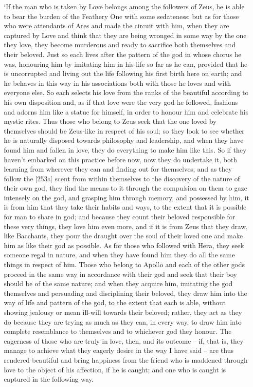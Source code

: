 ‘If the man who is taken by Love belongs among the followers of Zeus, he
is able to bear the burden of the Feathery One with some sedateness; but
as for those who were attendants of
Ares  and made
the circuit with him, when they are captured by Love and think that they
are being wronged in some way by the one they love, they become
murderous and ready to sacrifice both themselves and their beloved. Just
so each lives after the pattern  of the god in whose chorus he
was, honouring him by imitating him in his life so far as he can,
provided that he is uncorrupted and living out the life following his
first birth here on earth; and he behaves in this way in his
associations both with those he loves and with everyone else. So each
selects his love from  the ranks of the beautiful according to
his own disposition and, as if that love were the very god he followed,
fashions and adorns him like a statue for himself, in order to honour
him  and celebrate his mystic rites. Thus those who belong to
Zeus seek that the one loved by themselves should be Zeus-like in
respect of his soul; so they look to see whether he is naturally
disposed towards philosophy and leadership, and when they have found him
and fallen in love, they do everything to make  him like this.
So if they haven't embarked on this
practice before now, now
they do undertake it, both learning from wherever they can and finding
out for themselves; and as they follow the {[}253a{]} scent from within
themselves to the discovery of the nature of their own god, they find
the means to it through the compulsion on them to gaze intensely on the
god, and grasping him through memory, and possessed by him, it is from
him that they take their habits and ways, to the extent that it is
possible for man  to share in god; and because they count their
beloved responsible for these very things, they love him even more, and
if it is from Zeus that they draw, like Bacchants, they pour the draught
 over the soul of their loved one and make him as like their god
as possible. As for those who followed with Hera, they seek someone
regal in nature, and when they have found him they do all the same
things in respect of him. Those who belong to Apollo and each of the
other gods proceed in the same way in accordance with their god and seek
that their boy should be of  the same nature; and when they
acquire him, imitating the god themselves and persuading and
disciplining their beloved, they draw him into the way of life and
pattern of the god, to the extent that each is able, without showing
jealousy or mean  ill-will towards their beloved; rather, they
act as they do because they are trying as much as they can, in every
way, to draw him into complete resemblance to themselves and to
whichever god they honour. The eagerness of those who are truly in love,
then, and its outcome --
if, that is, they manage to achieve what they eagerly desire in the way
I have said -- are thus rendered  beautiful and bring happiness
from the friend who is maddened through love to the object of his
affection, if he is caught; and one who is caught is captured in the
following way.

